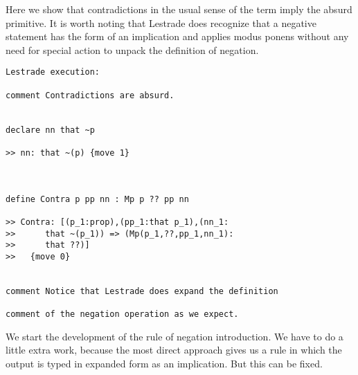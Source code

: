 \documentclass[12pt]{article}
\begin{document}
Here we show that contradictions in the usual sense of the term imply the absurd primitive.  It is worth noting that Lestrade
does recognize that a negative statement has the form of an implication and applies modus ponens without any need for special action to unpack the definition of negation.

\begin{verbatim}Lestrade execution:

comment Contradictions are absurd.


declare nn that ~p

>> nn: that ~(p) {move 1}



define Contra p pp nn : Mp p ?? pp nn

>> Contra: [(p_1:prop),(pp_1:that p_1),(nn_1:
>>      that ~(p_1)) => (Mp(p_1,??,pp_1,nn_1):
>>      that ??)]
>>   {move 0}


comment Notice that Lestrade does expand the definition

comment of the negation operation as we expect.

\end{verbatim}

We start the development of the rule of negation introduction.   We have to do a little extra work, because the most direct approach gives us a rule
in which the output is typed in expanded form as an implication.   But this can be fixed.
\end{document}
